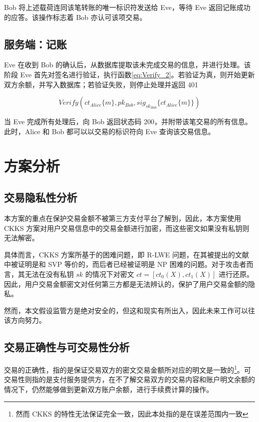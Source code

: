 Bob 将上述载荷连同该笔转账的唯一标识符发送给 Eve，等待 Eve 返回记账成功的应答。该操作标志着 Bob 亦认可该项交易。

\subsection{服务端：记账}

Eve 在收到 Bob 的确认后，从数据库提取该未完成交易的信息，并进行处理。该阶段 Eve 首先对签名进行验证，执行函数\eqref{eq:Verify_2}。若验证为真，则开始更新双方余额，并写入数据库；若验证失败，则停止处理并返回 401 

\begin{equation} \label{eq:Verify_2}
    Verify(ct_{Alice}\{m\}, pk_{Bob}, sig_{sk_{Bob}}\{ct_{Alice}\{m\}\})
\end{equation}

当 Eve 完成所有处理后，向 Bob 返回状态码 200，并附带该笔交易的所有信息。此时，Alice 和 Bob 都可以以交易的标识符向 Eve 查询该交易信息。

\section{方案分析}

\subsection{交易隐私性分析}

本方案的重点在保护交易金额不被第三方支付平台了解到，因此，本方案使用 CKKS 方案对用户交易信息中的交易金额进行加密，而这些密文如果没有私钥则无法解密。

具体而言，CKKS 方案所基于的困难问题，即 R-LWE 问题，在其被提出的文献\cite{cryptoeprint:2012/230}中被证明是和 SVP 等价的，而后者已经被证明是 NP 困难的问题\cite{10.1145/276698.276705}。对于攻击者而言，其无法在没有私钥 $sk$ 的情况下对密文 $ct = [ct_0(X), ct_1(X)]$ 进行还原。因此，用户交易金额密文对任何第三方都是无法辨认的，保护了用户交易金额的隐私。

然而，本文假设监管方是绝对安全的，但这和现实有所出入，因此未来工作可以往该方向努力。%

\subsection{交易正确性与可交易性分析}

交易的正确性，指的是保证交易双方的密文交易金额所对应的明文是一致的\footnote{然而 CKKS 的特性无法保证完全一致，因此本处指的是在误差范围内一致}。可交易性则指的是支付服务提供方，在不了解交易双方的交易内容和账户明文余额的情况下，仍然能够做到更新双方账户余额，进行手续费计算的操作。

